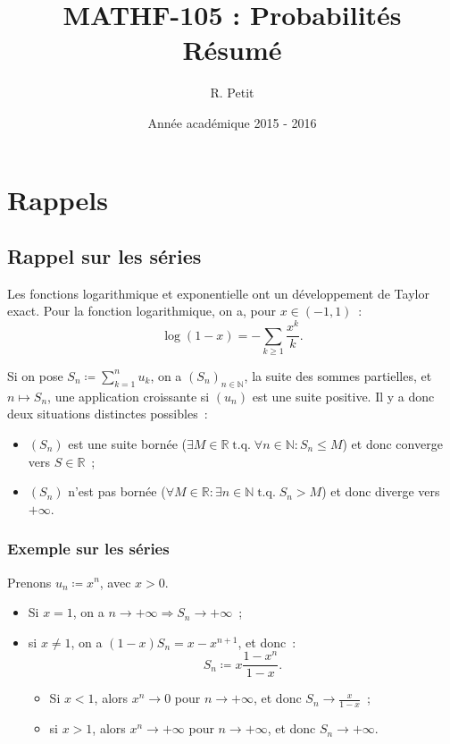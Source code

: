 \documentclass{article}
\author{R. Petit}
\title{MATHF-105 : Probabilités \\ Résumé}
\date{Année académique 2015 - 2016}
\newcommand{\N}{\mathbb N}
\newcommand{\R}{\mathbb R}
\DeclareMathOperator{\tq}{t.q.}
\theoremstyle{definition}
\theoremstyle{remark}
\begin{document}
\maketitle
\tableofcontents
\newpage
{}

\section{Rappels}
	\subsection{Rappel sur les séries}
		Les fonctions logarithmique et exponentielle ont un développement de Taylor exact. Pour la fonction logarithmique, on a, pour $x \in (-1, 1)$~:
		\[\log(1-x) = -\sum_{k \geq 1}\frac {x^k}k.\]

		Si on pose $S_n \coloneqq \sum_{k = 1}^nu_k$, on a $(S_n)_{n \in \N}$, la suite des sommes partielles, et $n \mapsto S_n$, une application croissante si
		$(u_n)$ est une suite positive. Il y a donc deux situations distinctes possibles~:

		\begin{itemize}
			\item $(S_n)$ est une suite bornée ($\exists M \in \R \tq \forall n \in \N : S_n \leq M$) et donc converge vers $S \in \R$~;
			\item $(S_n)$ n'est pas bornée ($\forall M \in \R : \exists n \in \N \tq S_n > M$) et donc diverge vers $+\infty$.
		\end{itemize}

		\subsubsection{Exemple sur les séries}
		Prenons $u_n \coloneqq x^n$, avec $x > 0$.

		\begin{itemize}
			\item Si $x = 1$, on a $n \to +\infty \Rightarrow S_n \to +\infty$~;
			\item si $x \neq 1$, on a $(1-x)S_n = x-x^{n+1}$, et donc~:
			      \[S_n \coloneqq x\frac {1-x^n}{1-x}.\]

			      \begin{itemize}
			      	\item Si $x < 1$, alors $x^n \to 0$ pour $n \to +\infty$, et donc $S_n \to \frac x{1-x}$~;
					\item si $x > 1$, alors $x^n \to +\infty$ pour $n \to +\infty$, et donc $S_n \to +\infty$.
			      \end{itemize}
		\end{itemize}
\end{document}
